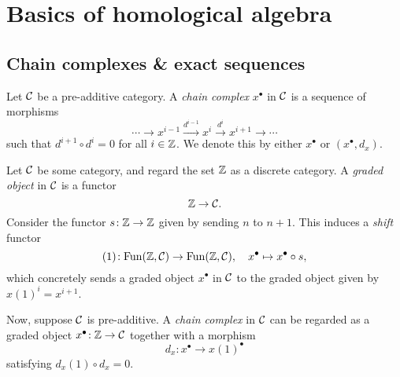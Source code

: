 
\section{Basics of homological algebra}
\subsection{Chain complexes \& exact sequences}\label{subsection:chain-complexes-and-exact-sequences}
\begin{definition}
	Let \(\mathcal{C}\) be a pre-additive category. A \emph{chain complex} \(x^\bullet\) in \(\mathcal{C}\) is a sequence of morphisms
	\[ \cdots \to x^{i-1}\xrightarrow{d^{i-1}} x^{i} \xrightarrow{d^{i}} x^{i+1} \to \cdots  \]
	such that \(d^{i+1}\circ d^i = 0\) for all \(i\in\mathbb{Z}\). We denote this by either \(x^\bullet\) or \((x^\bullet,d_x)\).
\end{definition}
\begin{remark}
	Let \(\mathcal{C}\) be some category, and regard the set \(\mathbb{Z}\) as a discrete category. A \emph{graded object} in \(\mathcal{C}\) is a functor
	\[ \mathbb{Z}\to\mathcal{C}. \]
	Consider the functor \(s\!:\mathbb{Z}\to\mathbb{Z}\) given by sending \(n\) to \(n+1\). This induces a \emph{shift} functor
	\[ (1)\!:\operatorname{Fun}(\mathbb{Z},\mathcal{C})\to\operatorname{Fun}(\mathbb{Z},\mathcal{C}),\quad x^\bullet \mapsto x^\bullet\circ s, \]
	which concretely sends a graded object \(x^\bullet\) in \(\mathcal{C}\) to the graded object given by \(x(1)^i = x^{i+1}\).

	Now, suppose \(\mathcal{C}\) is pre-additive. A \emph{chain complex} in \(\mathcal{C}\) can be regarded as a graded object \(x^\bullet\!:\mathbb{Z}\to\mathcal{C}\) together with a morphism
	\[ d_x\!:x^\bullet \to x(1)^\bullet \]
	satisfying \(d_x(1)\circ d_x = 0\).
\end{remark}

